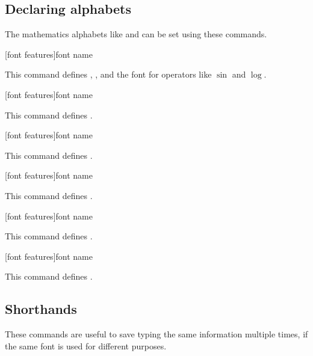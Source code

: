 \documentclass{ltxdockit}
\begin{document}
\subsection{Declaring alphabets}

The mathematics alphabets like  and  can be
set using these commands.

\begin{ltxsyntax}

  [font features]{font name}

  This command defines , ,  and
  the font for operators like $\sin$ and $\log$.

  [font features]{font name}

  This command defines .

  [font features]{font name}

  This command defines .

  [font features]{font name}

  This command defines .

  [font features]{font name}

  This command defines .

  [font features]{font name}

  This command defines .

\end{ltxsyntax}

\subsection{Shorthands}

These commands are useful to save typing the same information multiple
times, if the same font is used for different purposes.
\end{document}
